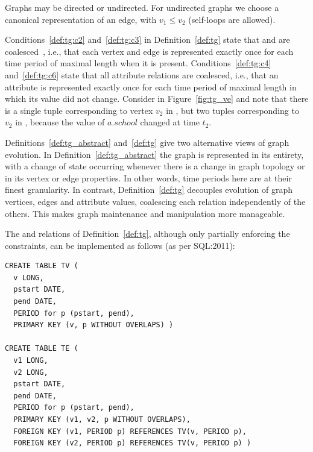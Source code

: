 Graphs may be directed or undirected.  For undirected graphs we choose
a canonical representation of an edge, with $v_1 \leq v_2$ (self-loops
are allowed).

Conditions~\ref{def:tg:c2} and~\ref{def:tg:c3} in
Definition~\ref{def:tg} state that \tv and \te are
coalesced~\cite{DBLP:conf/vldb/BohlenSS96}, i.e., that each vertex and
edge is represented exactly once for each time period of maximal
length when it is present.  Conditions~\ref{def:tg:c4}
and~\ref{def:tg:c6} state that all attribute relations are coalesced,
i.e., that an attribute is represented exactly once for each time
period of maximal length in which its value did not change.  Consider
 in Figure~\ref{fig:tg_ve} and note that there is a single
tuple corresponding to vertex $v_2$ in \tv, but two tuples
corresponding to $v_2$ in \tav, because the value of $a.school$
changed at time $t_2$.

Definitions~\ref{def:tg_abstract} and~\ref{def:tg} give two
alternative views of graph evolution.  In
Definition~\ref{def:tg_abstract} the graph is represented in its
entirety, with a change of state occurring whenever there is a change
in graph topology or in its vertex or edge properties.  In other
words, time periods here are at their finest granularity.  In
contrast, Definition~\ref{def:tg} decouples evolution of graph
vertices, edges and attribute values, coalescing each relation
independently of the others.  This makes graph maintenance and
manipulation more manageable.

The \tv and \te relations of Definition~\ref{def:tg}, although only
partially enforcing the constraints, can be implemented as follows (as
per SQL:2011):


\begin{small}
\begin{verbatim}
CREATE TABLE TV (
  v LONG,
  pstart DATE,
  pend DATE,
  PERIOD for p (pstart, pend),
  PRIMARY KEY (v, p WITHOUT OVERLAPS) )

CREATE TABLE TE (
  v1 LONG,
  v2 LONG,
  pstart DATE,
  pend DATE,
  PERIOD for p (pstart, pend),
  PRIMARY KEY (v1, v2, p WITHOUT OVERLAPS),
  FOREIGN KEY (v1, PERIOD p) REFERENCES TV(v, PERIOD p),
  FOREIGN KEY (v2, PERIOD p) REFERENCES TV(v, PERIOD p) )
\end{verbatim}
\end{small}


